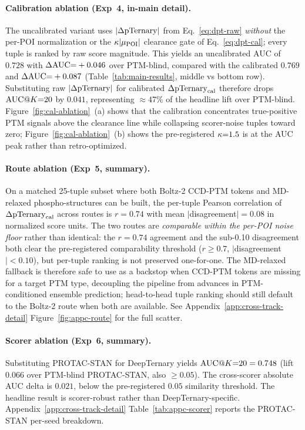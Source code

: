 \paragraph{Calibration ablation (Exp~4, in-main detail).} The uncalibrated variant uses $|\Delta\mathrm{pTernary}|$ from Eq.~\ref{eq:dpt-raw} \emph{without} the per-POI normalization or the $\kappa|\mu_{\mathrm{POI}}|$ clearance gate of Eq.~\ref{eq:dpt-cal}; every tuple is ranked by raw score magnitude. This yields an uncalibrated AUC of $0.728$ with $\Delta\mathrm{AUC}{=}+0.046$ over PTM-blind, compared with the calibrated $0.769$ and $\Delta\mathrm{AUC}{=}+0.087$ (Table~\ref{tab:main-results}, middle vs bottom row). Substituting raw $|\Delta\mathrm{pTernary}|$ for calibrated $\Delta\mathrm{pTernary}_{\mathrm{cal}}$ therefore drops $\mathrm{AUC}@K{=}20$ by $0.041$, representing $\approx 47\%$ of the headline lift over PTM-blind. Figure~\ref{fig:cal-ablation}~(a) shows that the calibration concentrates true-positive PTM signals above the clearance line while collapsing scorer-noise tuples toward zero; Figure~\ref{fig:cal-ablation}~(b) shows the pre-registered $\kappa{=}1.5$ is at the AUC peak rather than retro-optimized.

\paragraph{Route ablation (Exp~5, summary).} On a matched 25-tuple subset where both Boltz-2 CCD-PTM tokens and MD-relaxed phospho-structures can be built, the per-tuple Pearson correlation of $\Delta\mathrm{pTernary}_{\mathrm{cal}}$ across routes is $r{=}0.74$ with mean $|$disagreement$| = 0.08$ in normalized score units. The two routes are \emph{comparable within the per-POI noise floor} rather than identical: the $r{=}0.74$ agreement and the sub-0.10 disagreement both clear the pre-registered comparability threshold ($r{\geq}0.7$, $|$disagreement$|<0.10$), but per-tuple ranking is not preserved one-for-one. The MD-relaxed fallback is therefore safe to use as a backstop when CCD-PTM tokens are missing for a target PTM type, decoupling the pipeline from advances in PTM-conditioned ensemble prediction; head-to-head tuple ranking should still default to the Boltz-2 route when both are available. See Appendix~\ref{app:cross-track-detail} Figure~\ref{fig:appc-route} for the full scatter.

\paragraph{Scorer ablation (Exp~6, summary).} Substituting PROTAC-STAN for DeepTernary yields $\mathrm{AUC}@K{=}20 = 0.748$ (lift $0.066$ over PTM-blind PROTAC-STAN, also $\geq 0.05$). The cross-scorer absolute AUC delta is $0.021$, below the pre-registered $0.05$ similarity threshold. The headline result is scorer-robust rather than DeepTernary-specific. Appendix~\ref{app:cross-track-detail} Table~\ref{tab:appc-scorer} reports the PROTAC-STAN per-seed breakdown.

